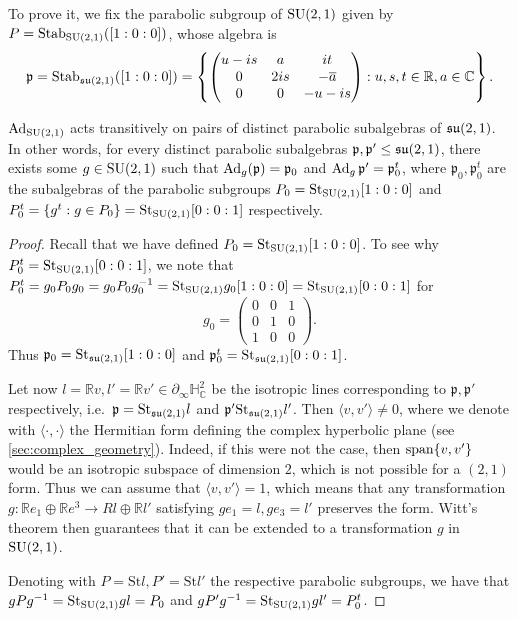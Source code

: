 \documentclass{report}
\begin{document}
To prove it, we fix the parabolic subgroup of $\operatorname{{\mathrm{SU}}}(2,1)$ given by $P = \operatorname{Stab}_{\operatorname{{\mathrm{SU}}}(2,1)}([1:0:0])$,
whose algebra is
\[
\mathfrak p = \operatorname{Stab}_{\operatorname{{\mathfrak{su}}}(2,1)}([1:0:0]) = \left\{
    \begin{pmatrix}
        u - is & a & it\\
        0 & 2is & -\overline{a}\\
        0 & 0 & -u - is
    \end{pmatrix} : u,s,t \in \mathbb R, a \in \mathbb C
\right\}.
\]
\begin{lemma}\label{lem:adjoint_parabolic}
    $\operatorname{Ad}_{\operatorname{{\mathrm{SU}}}(2,1)}$ acts transitively on pairs of distinct parabolic subalgebras of $\operatorname{{\mathfrak{su}}}(2,1)$.
    In other words, for every distinct parabolic subalgebras $\mathfrak p, \mathfrak p' \leq \operatorname{{\mathfrak{su}}}(2,1)$, there exists some $g \in \operatorname{{\mathrm{SU}}}(2,1)$ such that $\operatorname{Ad}_g(\mathfrak p) = \mathfrak p_0$ and $\operatorname{Ad}_g \mathfrak p' = \mathfrak p_0^t$, where $\mathfrak p_0,  \mathfrak p_0^t$ are the subalgebras of the parabolic subgroups $P_0 = \mathrm{St}_{\operatorname{{\mathrm{SU}}}(2,1)} [1:0:0]$ and $P_0^t = \left\{ g^t : g \in P_0 \right\} = \mathrm{St}_{\operatorname{{\mathrm{SU}}}(2,1)} [0:0:1]$ respectively.
\end{lemma}
\begin{proof}
    Recall that we have defined $P_0 = \mathrm{St}_{\operatorname{{\mathrm{SU}}}(2,1)}[1:0:0]$.
    To see why $P_0^t = \mathrm{St}_{\operatorname{{\mathrm{SU}}}(2,1)}[0:0:1]$, we note that $P_0^t = g_0 P_0 g_0 = g_0 P_0 g_0^{-1} = \mathrm{St}_{\operatorname{{\mathrm{SU}}}(2,1)} g_0 [1:0:0] = \mathrm{St}_{\operatorname{{\mathrm{SU}}}(2,1)} [0:0:1]$ for
    \[
    g_0 = \begin{pmatrix} 0 & 0 & 1 \\ 0 & 1 & 0 \\ 1 & 0 & 0 \end{pmatrix}.
    \]
    Thus $\mathfrak p_0 = \mathrm{St}_{\operatorname{{\mathfrak{su}}}(2,1)}[1:0:0]$ and $\mathfrak p_0^t = \mathrm{St}_{\operatorname{{\mathfrak{su}}}(2,1)}[0:0:1]$.
    
    Let now $l = \mathbb Rv, l' = \mathbb Rv' \in \partial_\infty \mathbb H^2_\mathbb C$ be the isotropic lines corresponding to $\mathfrak p, \mathfrak p'$ respectively, i.e.\ $\mathfrak p = \mathrm{St}_{\operatorname{{\mathfrak{su}}}(2,1)}l$ and $\mathfrak p' \mathrm{St}_{\operatorname{{\mathfrak{su}}}(2,1)}l'$.
    Then $\langle v, v' \rangle \neq 0$, where we denote with $\langle \cdot, \cdot \rangle$ the Hermitian form defining the complex hyperbolic plane (see \cref{sec:complex_geometry}).
    Indeed, if this were not the case, then $\operatorname{span} \{v, v' \}$ would be an isotropic subspace of dimension $2$, which is not possible for a $(2,1)$ form.
    Thus we can assume that $\langle v, v' \rangle = 1$, which means that any transformation $g: \mathbb R e_1 \oplus \mathbb Re^3 \to R l \oplus \mathbb Rl'$ satisfying $g e_1 = l, ge_3 = l'$ preserves the form.
    Witt's theorem then guarantees that it can be extended to a transformation $g$ in $\operatorname{{\mathrm{SU}}}(2,1)$.

    Denoting with $P = \mathrm{St}l, P' = \mathrm{St}l'$ the respective parabolic subgroups, we have that $g P g^{-1} = \mathrm{St}_{\operatorname{{\mathrm{SU}}}(2,1)}gl = P_0$ and $g P' g^{-1} = \mathrm{St}_{\operatorname{{\mathrm{SU}}}(2,1)}gl' = P_0^t$.
\end{proof}
\end{document}
